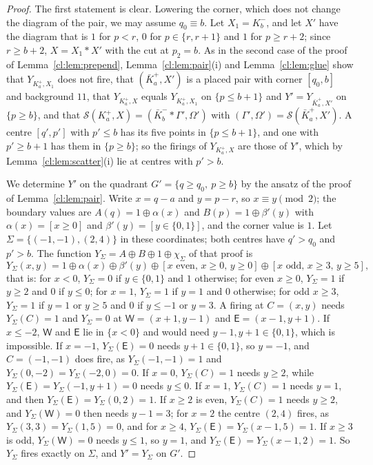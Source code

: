 \begin{proof}
The first statement is clear. Lowering the corner, which does not change the diagram of the pair, we may assume $q_0\equiv b$. Let $X_1=K^-_b$, and let $X'$ have the diagram that is $1$ for $p<r$, $0$ for $p\in\{r,r+1\}$ and $1$ for $p\ge r+2$; since $r\ge b+2$, $X=X_1*X'$ with the cut at $p_2=b$. As in the second case of the proof of Lemma~\ref{cl:lem:prepend}, Lemma~\ref{cl:lem:pair}(i) and Lemma~\ref{cl:lem:glue} show that $Y_{K^+_a,X_1}$ does not fire, that $(\bar K^+_a,X')$ is a placed pair with corner $[q_0,b]$ and background $11$, that $Y_{K^+_a,X}$ equals $Y_{K^+_a,X_1}$ on $\{p\le b+1\}$ and $Y'=Y_{\bar K^+_a,X'}$ on $\{p\ge b\}$, and that $\mathcal S(K^+_a,X)=(\bar K^-_b*\Gamma',\Omega')$ with $(\Gamma',\Omega')=\mathcal S(\bar K^+_a,X')$. A centre $[q',p']$ with $p'\le b$ has its five points in $\{p\le b+1\}$, and one with $p'\ge b+1$ has them in $\{p\ge b\}$; so the firings of $Y_{K^+_a,X}$ are those of $Y'$, which by Lemma~\ref{cl:lem:scatter}(i) lie at centres with $p'>b$.

We determine $Y'$ on the quadrant $G'=\{q\ge q_0,\ p\ge b\}$ by the ansatz of the proof of Lemma~\ref{cl:lem:pair}. Write $x=q-a$ and $y=p-r$, so $x\equiv y\pmod2$; the boundary values are $A(q)=1\oplus\alpha(x)$ and $B(p)=1\oplus\beta'(y)$ with $\alpha(x)=[x\ge0]$ and $\beta'(y)=[y\in\{0,1\}]$, and the corner value is $1$. Let $\Sigma=\{(-1,-1),(2,4)\}$ in these coordinates; both centres have $q'>q_0$ and $p'>b$. The function $Y_\Sigma=A\oplus B\oplus1\oplus\chi_\Sigma$ of that proof is
\[
Y_\Sigma(x,y)=1\oplus\alpha(x)\oplus\beta'(y)\oplus[x\text{ even},\,x\ge0,\,y\ge0]\oplus[x\text{ odd},\,x\ge3,\,y\ge5],
\]
that is: for $x<0$, $Y_\Sigma=0$ if $y\in\{0,1\}$ and $1$ otherwise; for even $x\ge0$, $Y_\Sigma=1$ if $y\ge2$ and $0$ if $y\le0$; for $x=1$, $Y_\Sigma=1$ if $y=1$ and $0$ otherwise; for odd $x\ge3$, $Y_\Sigma=1$ if $y=1$ or $y\ge5$ and $0$ if $y\le-1$ or $y=3$. A firing at $C=(x,y)$ needs $Y_\Sigma(C)=1$ and $Y_\Sigma=0$ at $\mathsf W=(x+1,y-1)$ and $\mathsf E=(x-1,y+1)$. If $x\le-2$, $\mathsf W$ and $\mathsf E$ lie in $\{x<0\}$ and would need $y-1,y+1\in\{0,1\}$, which is impossible. If $x=-1$, $Y_\Sigma(\mathsf E)=0$ needs $y+1\in\{0,1\}$, so $y=-1$, and $C=(-1,-1)$ does fire, as $Y_\Sigma(-1,-1)=1$ and $Y_\Sigma(0,-2)=Y_\Sigma(-2,0)=0$. If $x=0$, $Y_\Sigma(C)=1$ needs $y\ge2$, while $Y_\Sigma(\mathsf E)=Y_\Sigma(-1,y+1)=0$ needs $y\le0$. If $x=1$, $Y_\Sigma(C)=1$ needs $y=1$, and then $Y_\Sigma(\mathsf E)=Y_\Sigma(0,2)=1$. If $x\ge2$ is even, $Y_\Sigma(C)=1$ needs $y\ge2$, and $Y_\Sigma(\mathsf W)=0$ then needs $y-1=3$; for $x=2$ the centre $(2,4)$ fires, as $Y_\Sigma(3,3)=Y_\Sigma(1,5)=0$, and for $x\ge4$, $Y_\Sigma(\mathsf E)=Y_\Sigma(x-1,5)=1$. If $x\ge3$ is odd, $Y_\Sigma(\mathsf W)=0$ needs $y\le1$, so $y=1$, and $Y_\Sigma(\mathsf E)=Y_\Sigma(x-1,2)=1$. So $Y_\Sigma$ fires exactly on $\Sigma$, and $Y'=Y_\Sigma$ on $G'$.


\end{proof}
